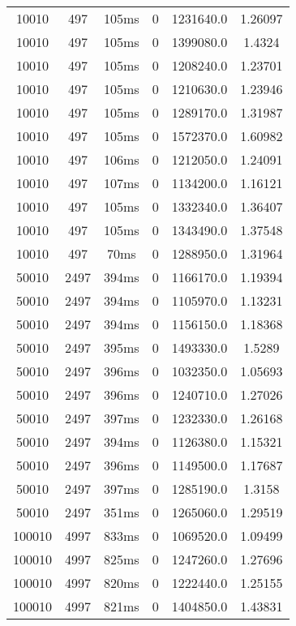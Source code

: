 \documentclass[./main.tex]{subfiles}
\begin{document}
\begin{table}
\begin{tabular}{ c | c | c | c | c | c }
        \hline
        10010 & 497 & 105ms & 0 & 1231640.0 & 1.26097 \\
        10010 & 497 & 105ms & 0 & 1399080.0 & 1.4324 \\
        10010 & 497 & 105ms & 0 & 1208240.0 & 1.23701 \\
        10010 & 497 & 105ms & 0 & 1210630.0 & 1.23946 \\
        10010 & 497 & 105ms & 0 & 1289170.0 & 1.31987 \\
        10010 & 497 & 105ms & 0 & 1572370.0 & 1.60982 \\
        10010 & 497 & 106ms & 0 & 1212050.0 & 1.24091 \\
        10010 & 497 & 107ms & 0 & 1134200.0 & 1.16121 \\
        10010 & 497 & 105ms & 0 & 1332340.0 & 1.36407 \\
        10010 & 497 & 105ms & 0 & 1343490.0 & 1.37548 \\
        \rowcolor{lightgray} 10010 & 497 & 70ms & 0 & 1288950.0 & 1.31964 \\
        \hline
        \rowcolor{lightgray} 50010 & 2497 & 394ms & 0 & 1166170.0 & 1.19394 \\
        50010 & 2497 & 394ms & 0 & 1105970.0 & 1.13231 \\
        50010 & 2497 & 394ms & 0 & 1156150.0 & 1.18368 \\
        50010 & 2497 & 395ms & 0 & 1493330.0 & 1.5289 \\
        50010 & 2497 & 396ms & 0 & 1032350.0 & 1.05693 \\
        50010 & 2497 & 396ms & 0 & 1240710.0 & 1.27026 \\
        50010 & 2497 & 397ms & 0 & 1232330.0 & 1.26168 \\
        50010 & 2497 & 394ms & 0 & 1126380.0 & 1.15321 \\
        50010 & 2497 & 396ms & 0 & 1149500.0 & 1.17687 \\
        50010 & 2497 & 397ms & 0 & 1285190.0 & 1.3158 \\
        50010 & 2497 & 351ms & 0 & 1265060.0 & 1.29519 \\
        \hline
        100010 & 4997 & 833ms & 0 & 1069520.0 & 1.09499 \\
        100010 & 4997 & 825ms & 0 & 1247260.0 & 1.27696 \\
        100010 & 4997 & 820ms & 0 & 1222440.0 & 1.25155 \\
        100010 & 4997 & 821ms & 0 & 1404850.0 & 1.43831 \\

\end{tabular}
\end{table}
\end{document}
